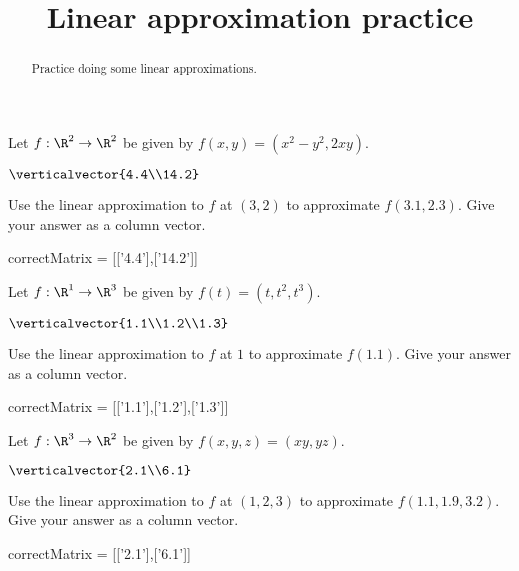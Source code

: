 \documentclass{ximera}
\title{Linear approximation practice}
\begin{document}
	\begin{abstract}
		Practice doing some linear approximations.
	\end{abstract}\maketitle
	
	\begin{question}
		Let $f:\R^2 \to \R^2$ be given by $f(x,y) = (x^2-y^2,2xy)$.
		\begin{solution}
			\begin{hint}
				$\verticalvector{4.4\\14.2}$
			\end{hint}
			Use the linear approximation to $f$ at $(3,2)$ to approximate $f(3.1,2.3)$.  Give your answer as a column vector.
			\begin{matrix-answer}
				correctMatrix = [['4.4'],['14.2']]
			\end{matrix-answer}
		\end{solution}
	\end{question}
	
	\begin{question}
		Let $f:\R^1 \to \R^3$ be given by $f(t) = (t,t^2,t^3)$.
		\begin{solution}
			\begin{hint}
				$\verticalvector{1.1\\1.2\\1.3}$
			\end{hint}
			Use the linear approximation to $f$ at $1$ to approximate $f(1.1)$.  Give your answer as a column vector.
			\begin{matrix-answer}
				correctMatrix = [['1.1'],['1.2'],['1.3']]
			\end{matrix-answer}
		\end{solution}
	\end{question}
	
    \begin{question}
		Let $f:\R^3\to \R^2$ be given by $f(x,y,z) = (xy,yz)$.
		\begin{solution}
			\begin{hint}
				$\verticalvector{2.1\\6.1}$
			\end{hint}

			Use the linear approximation to $f$ at $(1,2,3)$ to approximate $f(1.1,1.9,3.2)$.  Give your answer as a column vector.
			\begin{matrix-answer}
				correctMatrix = [['2.1'],['6.1']]
			\end{matrix-answer}
		\end{solution}
	\end{question}	
\end{document}
